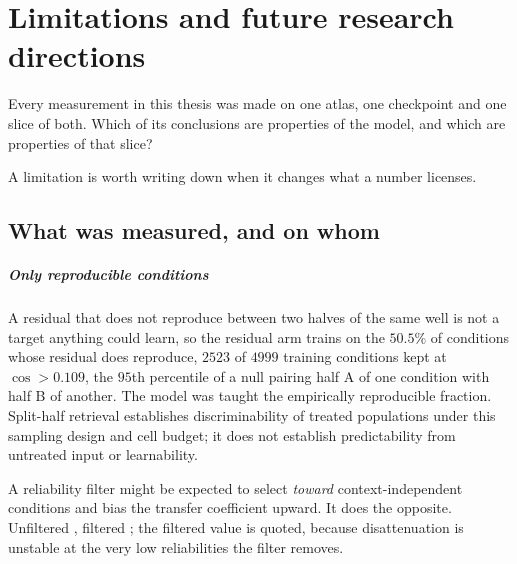 
\chapter{Limitations and future research directions}
\label{sec:limitations}

\begin{question}
Every measurement in this thesis was made on one atlas, one checkpoint and one
slice of both. Which of its conclusions are properties of the model, and which
are properties of that slice?
\end{question}

\noindent
A limitation is worth writing down when it changes what a number licenses.

\section{What was measured, and on whom}
\label{sec:lim-population}

\paragraph{Only reproducible conditions} A residual that does not reproduce
between two halves of the same well is not a target anything could learn, so the
residual arm trains on the $50.5\%$ of conditions whose residual does reproduce,
$\num{2523}$ of $\num{4999}$ training conditions kept at $\cos > 0.109$, the
$95$th percentile of a null pairing half A of one condition with half B of
another. The model was taught the
empirically reproducible fraction. Split-half retrieval establishes
discriminability of treated populations under this sampling design and cell
budget; it does not establish predictability from untreated input or
learnability.

A reliability filter might be expected to select \emph{toward}
context-in\-de\-pen\-dent conditions and bias the transfer coefficient upward.
It does the opposite. Unfiltered , filtered
; the filtered value is quoted, because disattenuation
is unstable at the very low reliabilities the filter removes.


